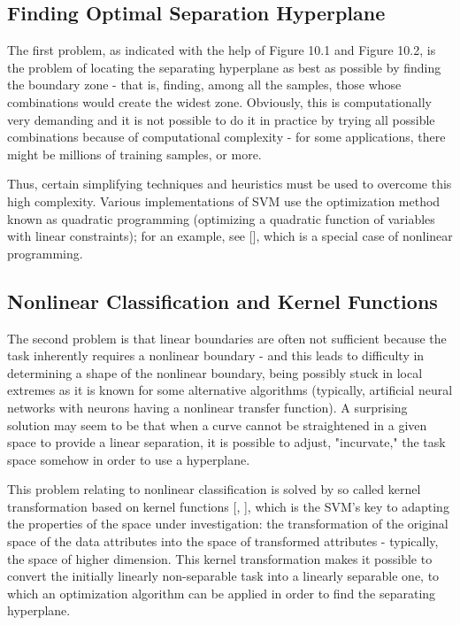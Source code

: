\subsection{Finding Optimal Separation Hyperplane}
The first problem, as indicated with the help of Figure 10.1 and Figure 10.2, is the problem of locating the separating hyperplane as best as possible by finding the boundary zone - that is, finding, among all the samples, those whose combinations would create the widest zone. Obviously, this is computationally very demanding and it is not possible to do it in practice by trying all possible combinations because of computational complexity - for some applications, there might be millions of training samples, or more.

Thus, certain simplifying techniques and heuristics must be used to overcome this high complexity. Various implementations of SVM use the optimization method known as quadratic programming (optimizing a quadratic function of variables with linear constraints); for an example, see [\cite{ref24}], which is a special case of nonlinear programming.

\subsection{Nonlinear Classification and Kernel Functions}
The second problem is that linear boundaries are often not sufficient because the task inherently requires a nonlinear boundary - and this leads to difficulty in determining a shape of the nonlinear boundary, being possibly stuck in local extremes as it is known for some alternative algorithms (typically, artificial neural networks with neurons having a nonlinear transfer function). A surprising solution may seem to be that when a curve cannot be straightened in a given space to provide a linear separation, it is possible to adjust, "incurvate," the task space somehow in order to use a hyperplane.

This problem relating to nonlinear classification is solved by so called kernel transformation based on kernel functions [\cite{ref30}, \cite{ref243}], which is the SVM's key to adapting the properties of the space under investigation: the transformation of the original space of the data attributes into the space of transformed attributes - typically, the space of higher dimension. This kernel transformation makes it possible to convert the initially linearly non-separable task into a linearly separable one, to which an optimization algorithm can be applied in order to find the separating hyperplane.

